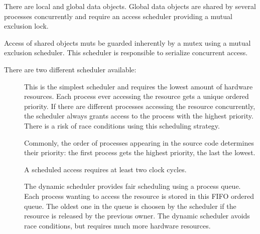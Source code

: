 \documentclass[a4paper,12pt,twoside,english]{article}
\begin{document}
There are local and global data objects. Global data objects are shared by several processes concurrently and require an access scheduler providing a mutual
exclusion lock.


\vskip5pt



\vskip5pt

\def\thesubsubsection{\tocXV}
\secIII{\label{toclabelXV}\thesubsubsection}
Access of shared objects muts be guarded inherently by a mutex using a mutual exclusion scheduler.
This scheduler is responsible to serialize concurrent access. 


\vskip5pt
There are two different scheduler available:


\vskip5pt

\begin{description}
\item[] $ $\\
This is the simplest scheduler and requires the lowest amount of hardware resources. Each process ever accessing the resource gets a unique ordered priority. If
there are different processes accessing the resource concurrently, the scheduler always grants access to the process with the highest priority. There is a risk
of race conditions using this scheduling strategy.

Commonly, the order of processes appearing in the source code determines their priority: the first process gets the highest priority, the last the lowest.

A scheduled access requires at least two clock cycles.


\item[] $ $\\
The dynamic scheduler provides fair scheduling using a process queue. Each process wanting to access the resource is stored in this FIFO ordered queue. The
oldest one in the queue is choosen by the scheduler if the resource is released by the previous owner. The dynamic scheduler avoids race conditions, but
requires much more hardware resources.


\end{description}
\end{document}
